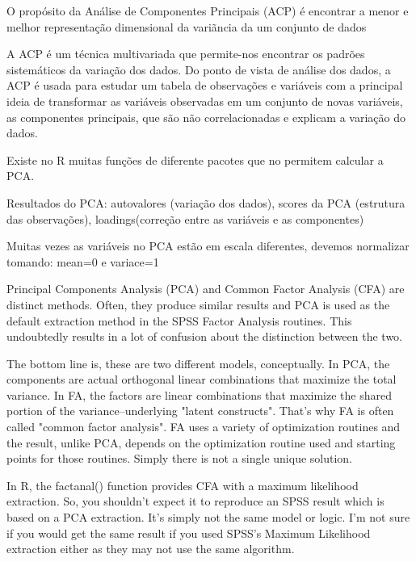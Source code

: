O propósito da Análise de Componentes Principais (ACP) é encontrar a menor e melhor representação dimensional da variãncia da um conjunto de dados 

A ACP é um técnica multivariada que permite-nos encontrar os padrões sistemáticos da variação dos dados. Do ponto de vista de análise dos dados, a ACP é usada para estudar um tabela de observações e variáveis com a principal ideia de transformar as variáveis observadas em um conjunto de novas variáveis, as componentes principais, que são não correlacionadas e explicam a variação do dados. 

Existe no R muitas funções de diferente pacotes que no permitem calcular a PCA.

Resultados do PCA: autovalores (variação dos dados), scores da PCA (estrutura das observações), loadings(correção entre as variáveis e as componentes)

Muitas vezes as variáveis no PCA estão em escala diferentes, devemos normalizar tomando:  mean=0 e variace=1

Principal Components Analysis (PCA) and Common Factor Analysis (CFA) are distinct methods. Often, they produce similar results and PCA is used as the default extraction method in the SPSS Factor Analysis routines. This undoubtedly results in a lot of confusion about the distinction between the two.

The bottom line is, these are two different models, conceptually. In PCA, the components are actual orthogonal linear combinations that maximize the total variance. In FA, the factors are linear combinations that maximize the shared portion of the variance--underlying "latent constructs". That's why FA is often called "common factor analysis". FA uses a variety of optimization routines and the result, unlike PCA, depends on the optimization routine used and starting points for those routines. Simply there is not a single unique solution.

In R, the factanal() function provides CFA with a maximum likelihood extraction. So, you shouldn't expect it to reproduce an SPSS result which is based on a PCA extraction. It's simply not the same model or logic. I'm not sure if you would get the same result if you used SPSS's Maximum Likelihood extraction either as they may not use the same algorithm. 


